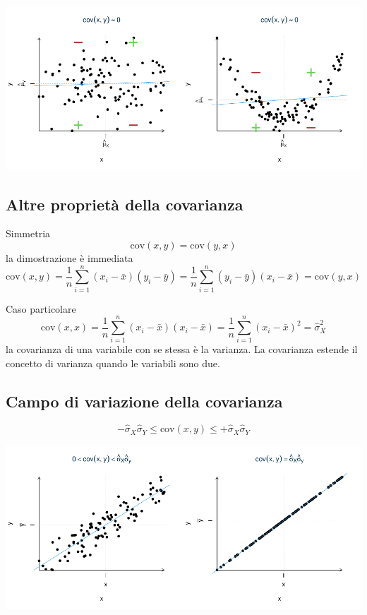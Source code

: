 \documentclass[
  11pt,
]{book}
\theoremstyle{mytheoremstyle}
\theoremstyle{mydefstyle}
\begin{document}
\begin{center}\includegraphics{Appunti_di_Statistica_2025_files/figure-latex/17-regressione-I-35-1} \end{center}

\subsection{Altre proprietà della covarianza}\label{altre-proprietuxe0-della-covarianza}

Simmetria
\[\text{cov}(x,y)=\text{cov}(y,x)\]
la dimostrazione è immediata
\[\text{cov}(x,y)=\frac 1 n\sum_{i=1}^n{(x_i-\bar x)(y_i-\bar y)}=\frac 1 n\sum_{i=1}^n{(y_i-\bar y)(x_i-\bar x)}=\text{cov}(y,x)\]

Caso particolare
\[\text{cov}(x,x)=\frac 1 n\sum_{i=1}^n{(x_i-\bar x)(x_i-\bar x)}=\frac 1 n\sum_{i=1}^n{(x_i-\bar x)^2}=\hat\sigma^2_X\]
la covarianza di una variabile con se stessa è la varianza.
La covarianza estende il concetto di varianza quando le variabili sono due.

\subsection{Campo di variazione della covarianza}\label{campo-di-variazione-della-covarianza}

\[-\hat\sigma_X\hat\sigma_Y\leq\text{cov}(x,y)\leq + \hat\sigma_X\hat\sigma_Y\]

\begin{center}\includegraphics{Appunti_di_Statistica_2025_files/figure-latex/17-regressione-I-36-1} \end{center}
\end{document}
